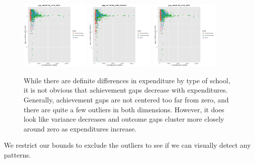 \documentclass{article}
\begin{document}
\begin{figure}[H]
\centering
\includegraphics[width=0.3\textwidth]{../images/eda_scatterplots/gap_completion_white_black.png}
\includegraphics[width=0.3\textwidth]{../images/eda_scatterplots/gap_completion_white_hispanic.png}
\includegraphics[width=0.3\textwidth]{../images/eda_scatterplots/gap_completion_white_black.png}
\caption{\label{fig:FullCompletionRates} While there are definite differences in expenditure by type of school, it is not obvious that achievement gaps decrease with expenditures. Generally, achievement gaps are not centered too far from zero, and there are quite a few outliers in both dimensions. However, it does look like variance decreases and outcome gaps cluster more closely around zero as expenditures increase.}
\end{figure}

We restrict our bounds to exclude the outliers to see if we can visually detect any patterns.
\end{document}
